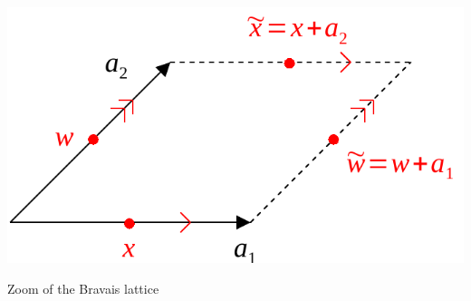 \documentclass[../main.tex]{subfiles}
\begin{document}
\begin{marginfigure}
	\includegraphics[width=1.1\linewidth]{images/zoom_lattice.pdf}
	\caption[Zoom of the Bravais lattice]{Zoom of the Bravais lattice}
\end{marginfigure} 
\end{document}
